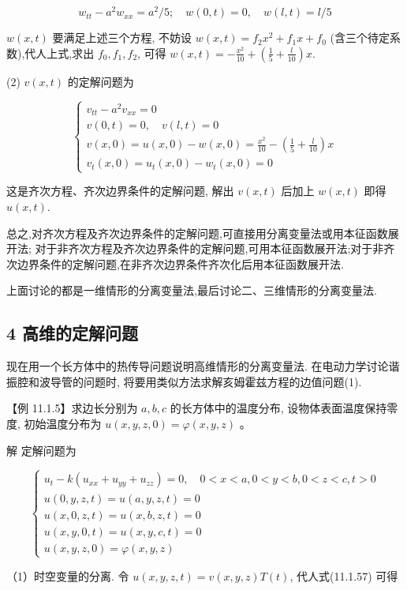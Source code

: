 $$
w_{t t}-a^{2} w_{x x}=a^{2} / 5 ; \quad w(0, t)=0, \quad w(l, t)=l / 5
$$

$w(x, t)$ 要满足上述三个方程, 不妨设 $w(x, t)=f_{2} x^{2}+f_{1} x+f_{0}$ (含三个待定系数),代人上式,求出 $f_{0}, f_{1}, f_{2}$, 可得 $w(x, t)=-\frac{x^{2}}{10}+\left(\frac{1}{5}+\frac{l}{10}\right) x$.

(2) $v(x, t)$ 的定解问题为

$$
\left\{\begin{array}{l}
v_{t t}-a^{2} v_{x x}=0 \\
v(0, t)=0, \quad v(l, t)=0 \\
v(x, 0)=u(x, 0)-w(x, 0)=\frac{x^{2}}{10}-\left(\frac{1}{5}+\frac{l}{10}\right) x \\
v_{t}(x, 0)=u_{t}(x, 0)-w_{t}(x, 0)=0
\end{array}\right.
$$

这是齐次方程、齐次边界条件的定解问题, 解出 $v(x, t)$ 后加上 $w(x, t)$ 即得 $u(x, t)$.

总之,对齐次方程及齐次边界条件的定解问题,可直接用分离变量法或用本征函数展开法; 对于非齐次方程及齐次边界条件的定解问题,可用本征函数展开法;对于非齐次边界条件的定解问题,在非齐次边界条件齐次化后用本征函数展开法.

上面讨论的都是一维情形的分离变量法,最后讨论二、三维情形的分离变量法.

\subsection{4 高维的定解问题}
现在用一个长方体中的热传导问题说明高维情形的分离变量法. 在电动力学讨论谐振腔和波导管的问题时, 将要用类似方法求解亥姆霍兹方程的边值问题(1).

【例 11.1.5】求边长分别为 $a, b, c$ 的长方体中的温度分布, 设物体表面温度保持零度, 初始温度分布为 $u(x, y, z, 0)=\varphi(x, y, z)$ 。

解 定解问题为

$$
\left\{\begin{array}{l}
u_{t}-k\left(u_{x x}+u_{y y}+u_{z z}\right)=0, \quad 0<x<a, 0<y<b, 0<z<c, t>0 \\
u(0, y, z, t)=u(a, y, z, t)=0 \\
u(x, 0, z, t)=u(x, b, z, t)=0 \\
u(x, y, 0, t)=u(x, y, c, t)=0 \\
u(x, y, z, 0)=\varphi(x, y, z)
\end{array}\right.
$$

（1）时空变量的分离. 令 $u(x, y, z, t)=v(x, y, z) T(t)$, 代人式(11.1.57) 可得

